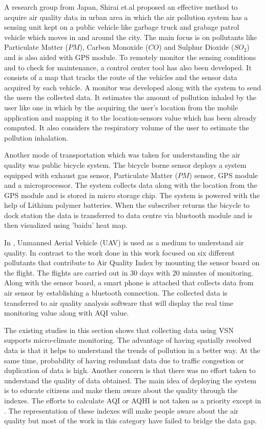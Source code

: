A research group from Japan, Shirai et.al \cite{Shirai2016} proposed an effective method to acquire air quality data in urban area in which the air pollution system has a sensing unit kept on a public vehicle like garbage truck and  grabage patrol vehicle which moves in and around the city. The main focus is on pollutants like Particulate Matter ($PM$), Carbon Monoxide ($CO$) and Sulphur Dioxide ($SO_2$) and is also aided with GPS module. To remotely monitor the sensing conditions and to check for maintenance, a control center tool has also been developed. It consists of a map that tracks the route of the vehicles and the sensor data acquired by each vehicle. A monitor was developed along with the system to send the users the collected data. It estimates the amount of pollution inhaled by the user like one in \cite{Devarakonda2013} which by the acquiring the user's location from the mobile application and mapping it to the location-sensors value which has been already computed. It also considers the respiratory volume of the user to estimate the pollution inhalation.

Another mode of transportation which was taken for understanding the air quality was public bicycle system. The bicycle borne sensor \cite{Xiang2016,Liu2015a} deploys a system equipped with exhaust gas sensor, Particulate Matter ($PM$) sensor, GPS module and a microprocessor. The system collects data along with the location from the GPS module and is stored in micro storage chip. The system is powered with the help of Lithium polymer batteries. When the subscriber returns the bicycle to dock station the data is transferred to data centre via bluetooth module and is then visualized using 'baidu' heat map.

In \cite{Zhi2017}, Unmanned Aerial Vehicle (UAV) is used as a medium to understand air quality.  In contrast to the work done in \cite{Hu2009,Hu2011,Volgyesi2008,Devarakonda2013,Shirai2016,Xiang2016,Liu2015a,Saha2017} this work focused on six different pollutants that contribute to Air Quality Index by mounting the sensor board on the flight. The flights are carried out in 30 days with 20 minutes of monitoring. Along with the sensor board, a smart phone is attached that collects data from air sensor by establishing a bluetooth connection. The collected data is transferred to air quality analysis software that will display the real time monitoring value along with AQI value. 

The existing studies in this section shows that collecting data using VSN supports micro-climate monitoring. The advantage of having spatially resolved data is that it helps to understand the trends of pollution in a better way. At the same time, probability of having redundant data due to traffic congestion or duplication of data is high. Another concern is that there was no effort taken to understand the quality of data obtained. The main idea of deploying the system is to educate citizens and make them aware about the quality through the indexes. 
The efforts to calculate AQI or AQHI is not taken as a priority except in \cite{Zhi2017}. The representation of  these indexes will make people aware about the air quality but most of the work in this category have failed to bridge the data gap.


